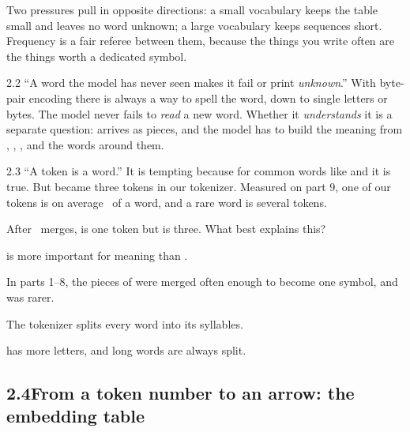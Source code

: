 \Why Two pressures pull in opposite directions: a small vocabulary keeps the table small and leaves no word
unknown; a large vocabulary keeps sequences short. Frequency is a fair referee between them, because the
things you write often are the things worth a dedicated symbol.

\begin{wrongidea}{2.2}
``A word the model has never seen makes it fail or print \emph{unknown}.'' With byte-pair encoding there is
always a way to spell the word, down to single letters or bytes. The model never fails to \emph{read} a new
word. Whether it \emph{understands} it is a separate question: \tok{\nTwoUnseenWord} arrives as pieces, and
the model has to build the meaning from , , ,  and the words around them.
\end{wrongidea}

\begin{wrongidea}{2.3}
``A token is a word.'' It is tempting because for common words like  and  it is
true. But  became three tokens in our tokenizer. Measured on part 9, one of our tokens is on average \nTwoWordsPerTok\ of a word, and a rare word is
several tokens.
\end{wrongidea}

\begin{checkq}
After \nTwoMerges\ merges,  is one token but  is three. What best explains this?
\begin{options}
\item {} is more important for meaning than .
\item In parts 1--8, the pieces of  were merged often enough to become one symbol, and
 was rarer.
\item The tokenizer splits every word into its syllables.
\item {} has more letters, and long words are always split.
\end{options}
\end{checkq}


\subsection*{2.4\quad From a token number to an arrow: the embedding table}

